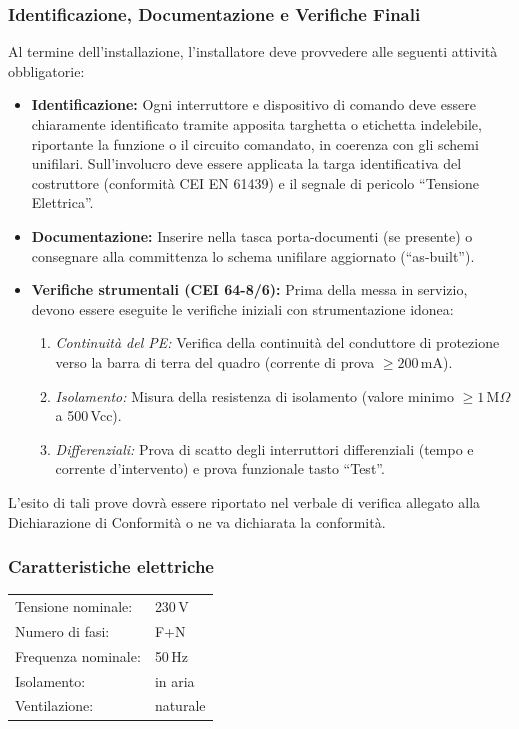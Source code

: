 \subsubsection{Identificazione, Documentazione e Verifiche Finali}
Al termine dell'installazione, l'installatore deve provvedere alle seguenti attività obbligatorie:

\begin{itemize}
\item \textbf{Identificazione:} Ogni interruttore e dispositivo di comando deve essere chiaramente identificato tramite apposita targhetta o etichetta indelebile, riportante la funzione o il circuito comandato, in coerenza con gli schemi unifilari. Sull'involucro deve essere applicata la targa identificativa del costruttore (conformità CEI EN 61439) e il segnale di pericolo ``Tensione Elettrica''.

\item \textbf{Documentazione:} Inserire nella tasca porta-documenti (se presente) o consegnare alla committenza lo schema unifilare aggiornato (``as-built'').

\item \textbf{Verifiche strumentali (CEI 64-8/6):} Prima della messa in servizio, devono essere eseguite le verifiche iniziali con strumentazione idonea:
\begin{enumerate}
\item \textit{Continuità del PE:} Verifica della continuità del conduttore di protezione verso la barra di terra del quadro (corrente di prova $\geq 200$\,mA).
\item \textit{Isolamento:} Misura della resistenza di isolamento (valore minimo $\geq 1$\,M$\Omega$ a 500\,Vcc).
\item \textit{Differenziali:} Prova di scatto degli interruttori differenziali (tempo e corrente d'intervento) e prova funzionale tasto ``Test''.
\end{enumerate}
\end{itemize}

L'esito di tali prove dovrà essere riportato nel verbale di verifica allegato alla Dichiarazione di Conformità o ne va dichiarata la conformità.


\subsubsection{Caratteristiche elettriche}

\begin{center}
\begin{tabular}{l@{\hspace{2em}}l}
Tensione nominale:   & 230\,V \\
Numero di fasi:      & F+N \\
Frequenza nominale: & 50\,Hz \\
Isolamento:          & in aria \\
Ventilazione:        & naturale \\
\end{tabular}
\end{center}


